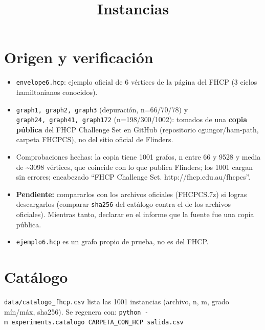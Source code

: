 \documentclass[
  spanish,
  11pt,
]{article}
\title{Instancias}
\author{}
\date{}
\providecommand{\tightlist}{%
  \setlength{\itemsep}{0pt}\setlength{\parskip}{0pt}}
\begin{document}
\maketitle

\section{Origen y verificación}\label{origen-y-verificaciuxf3n}

\begin{itemize}
\tightlist
\item
  \texttt{envelope6.hcp}: ejemplo oficial de 6 vértices de la página del
  FHCP (3 ciclos hamiltonianos conocidos).
\item
  \texttt{graph1,\ graph2,\ graph3} (depuración, n=66/70/78) y
  \texttt{graph24,\ graph41,\ graph172} (n=198/300/1002): tomados de una
  \textbf{copia pública} del FHCP Challenge Set en GitHub (repositorio
  cgungor/ham-path, carpeta FHCPCS), no del sitio oficial de Flinders.
\item
  Comprobaciones hechas: la copia tiene 1001 grafos, n entre 66 y 9528 y
  media de \textasciitilde3098 vértices, que coincide con lo que publica
  Flinders; los 1001 cargan sin errores; encabezado ``FHCP Challenge
  Set. http://fhcp.edu.au/fhcpcs''.
\item
  \textbf{Pendiente:} compararlos con los archivos oficiales (FHCPCS.7z)
  si logras descargarlos (comparar \texttt{sha256} del catálogo contra
  el de los archivos oficiales). Mientras tanto, declarar en el informe
  que la fuente fue una copia pública.
\item
  \texttt{ejemplo6.hcp} es un grafo propio de prueba, no es del FHCP.
\end{itemize}

\section{Catálogo}\label{catuxe1logo}

\texttt{data/catalogo\_fhcp.csv} lista las 1001 instancias (archivo, n,
m, grado mín/máx, sha256). Se regenera con:
\texttt{python\ -m\ experiments.catalogo\ CARPETA\_CON\_HCP\ salida.csv}
\end{document}
